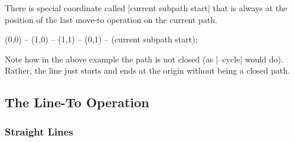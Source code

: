There is special coordinate called |current subpath start| that is
always at the position of the last move-to operation on the current
path.

\begin{codeexample}[]
\tikz [line width=2mm]
  \draw (0,0) -- (1,0) -- (1,1)
        -- (0,1) -- (current subpath start);
\end{codeexample}

Note how in the above example the path is not closed (as |--cycle|
would do). Rather, the line just starts and ends at the origin without
being a closed path.


\subsection{The Line-To Operation}

\subsubsection{Straight Lines}

